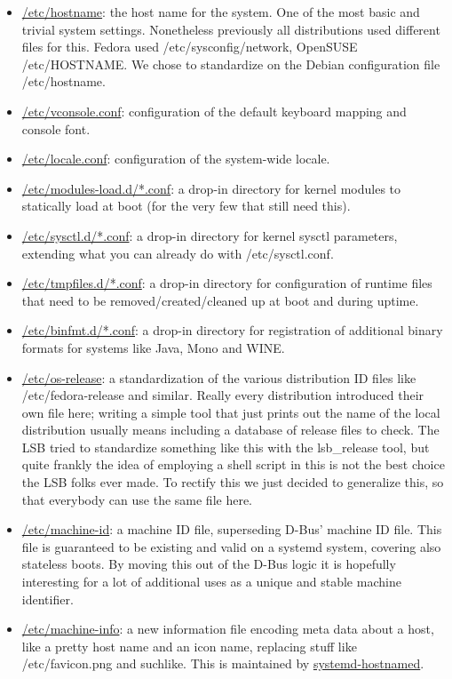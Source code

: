 \documentclass[titlepage]{article}
\begin{document}
\begin{itemize}
\item \href{https://0pointer.de/public/systemd-man/hostname.html}{/etc/hostname}: the host name for the system. One of the most basic and trivial system settings. Nonetheless previously all distributions used different files for this. Fedora used /etc/sysconfig/network, OpenSUSE /etc/HOSTNAME. We chose to standardize on the Debian configuration file /etc/hostname.
\item \href{https://0pointer.de/public/systemd-man/vconsole.conf.html}{/etc/vconsole.conf}: configuration of the default keyboard mapping and console font.
\item \href{https://0pointer.de/public/systemd-man/locale.conf.html}{/etc/locale.conf}: configuration of the system-wide locale.
\item \href{https://0pointer.de/public/systemd-man/modules-load.d.html}{/etc/modules-load.d/*.conf}: a drop-in directory for kernel modules to statically load at boot (for the very few that still need this).
\item \href{https://0pointer.de/public/systemd-man/sysctl.d.html}{/etc/sysctl.d/*.conf}: a drop-in directory for kernel sysctl parameters, extending what you can already do with /etc/sysctl.conf.
\item \href{https://0pointer.de/public/systemd-man/tmpfiles.d.html}{/etc/tmpfiles.d/*.conf}: a drop-in directory for configuration of runtime files that need to be removed/created/cleaned up at boot and during uptime.
\item \href{https://0pointer.de/public/systemd-man/binfmt.d.html}{/etc/binfmt.d/*.conf}: a drop-in directory for registration of additional binary formats for systems like Java, Mono and WINE.
\item \href{https://0pointer.de/public/systemd-man/os-release.html}{/etc/os-release}: a standardization of the various distribution ID files like /etc/fedora-release and similar. Really every distribution introduced their own file here; writing a simple tool that just prints out the name of the local distribution usually means including a database of release files to check. The LSB tried to standardize something like this with the lsb\_release tool, but quite frankly the idea of employing a shell script in this is not the best choice the LSB folks ever made. To rectify this we just decided to generalize this, so that everybody can use the same file here.
\item \href{https://0pointer.de/public/systemd-man/machine-id.html}{/etc/machine-id}: a machine ID file, superseding D-Bus' machine ID file. This file is guaranteed to be existing and valid on a systemd system, covering also stateless boots. By moving this out of the D-Bus logic it is hopefully interesting for a lot of additional uses as a unique and stable machine identifier.
\item \href{https://0pointer.de/public/systemd-man/machine-info.html}{/etc/machine-info}: a new information file encoding meta data about a host, like a pretty host name and an icon name, replacing stuff like /etc/favicon.png and suchlike. This is maintained by \href{https://www.freedesktop.org/wiki/Software/systemd/hostnamed}{systemd-hostnamed}.
\end{itemize}
\end{document}
